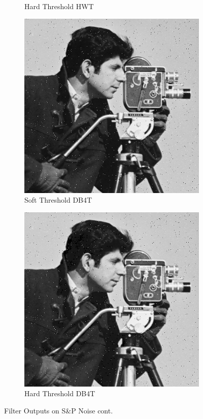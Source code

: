 \documentclass{article}\raggedbottom
\begin{document}
\begin{figure}[H]
\begin{subfigure}[b]{0.45\linewidth}
		\caption{Hard Threshold HWT}
	\end{subfigure}
	\begin{subfigure}[b]{0.45\linewidth}
		\includegraphics[width=\linewidth]{../../2_Software/data/IDB4T_soft_sp.png}
		\caption{Soft Threshold DB4T}
	\end{subfigure}
	\begin{subfigure}[b]{0.45\linewidth}
		\includegraphics[width=\linewidth]{../../2_Software/data/IDB4T_hard_sp.png}
		\caption{Hard Threshold DB4T}
	\end{subfigure}
	\caption{Filter Outputs on S\&P Noise cont.}
	\label{fig:filter_outputs_4}
\end{figure}
\end{document}
